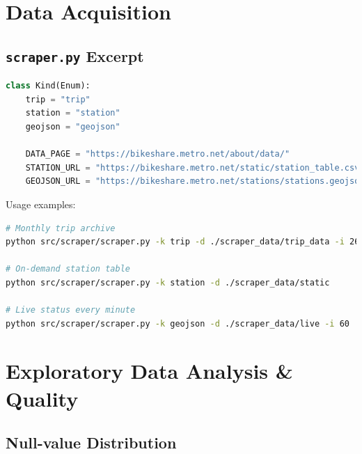 \documentclass{article}
\begin{document}
\section{Data Acquisition}

\subsection{\texttt{scraper.py} Excerpt}
\begin{lstlisting}[language=Python]
class Kind(Enum):
    trip = "trip"
    station = "station"
    geojson = "geojson"

    DATA_PAGE = "https://bikeshare.metro.net/about/data/"
    STATION_URL = "https://bikeshare.metro.net/static/station_table.csv"
    GEOJSON_URL = "https://bikeshare.metro.net/stations/stations.geojson"
\end{lstlisting}

Usage examples:
\begin{lstlisting}[language=bash]
# Monthly trip archive
python src/scraper/scraper.py -k trip -d ./scraper_data/trip_data -i 2628000

# On-demand station table
python src/scraper/scraper.py -k station -d ./scraper_data/static

# Live status every minute
python src/scraper/scraper.py -k geojson -d ./scraper_data/live -i 60
\end{lstlisting}

\section{Exploratory Data Analysis \& Quality}

\subsection{Null-value Distribution}
\end{document}
